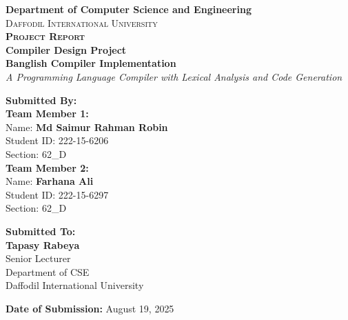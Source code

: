 \documentclass[12pt,a4paper]{article}
\begin{document}
\begin{titlepage}
    \centering
    \vspace*{1.5cm}
    
    {\Large\textbf{Department of Computer Science and Engineering}}\\[0.5cm]
    {\large\textsc{Daffodil International University}}\\[2.5cm]
    
    {\huge\bfseries\textsc{Project Report}}\\[0.8cm]
    {\Large\textbf{Compiler Design Project}}\\[1.5cm]
    
    {\LARGE\color{darkblue}\textbf{Banglish Compiler Implementation}}\\[0.5cm]
    {\large\textit{A Programming Language Compiler with Lexical Analysis and Code Generation}}\\[2.5cm]
    
    \begin{minipage}{0.48\textwidth}
        \begin{flushleft}
            \textbf{Submitted By:}\\[0.3cm]
            \textbf{Team Member 1:}\\
            Name: \textbf{Md Saimur Rahman Robin}\\
            Student ID: 222-15-6206\\
            Section: 62\_D\\[0.5cm]
            \textbf{Team Member 2:}\\
            Name: \textbf{Farhana Ali}\\
            Student ID: 222-15-6297\\
            Section: 62\_D\\
        \end{flushleft}
    \end{minipage}
    \hfill
    \begin{minipage}{0.48\textwidth}
        \begin{flushright}
            \textbf{Submitted To:}\\[0.3cm]
            \textbf{Tapasy Rabeya}\\
            Senior Lecturer\\
            Department of CSE\\
            Daffodil International University\\
        \end{flushright}
    \end{minipage}
    
    \vfill
    
    {\large\textbf{Date of Submission:} August 19, 2025}
    
\end{titlepage}
\end{document}
